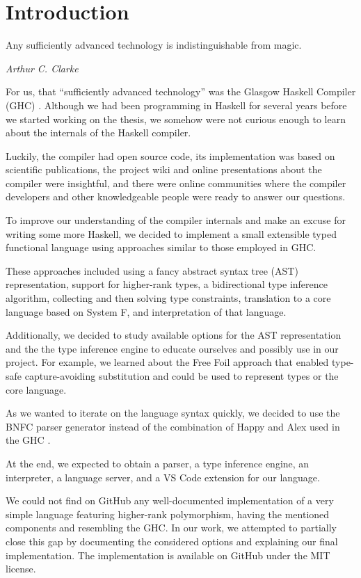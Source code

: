 \chapter{Introduction}
\label{chap:Introduction}

\epigraph{Any sufficiently advanced technology is indistinguishable from magic.}{\textit{Arthur C. Clarke}}

For us, that ``sufficiently advanced technology'' was the Glasgow Haskell Compiler (GHC) \cite{ghc-site}.
Although we had been programming in Haskell for several years before we started working on the thesis, we somehow were not curious enough to learn about the internals of the Haskell compiler.

Luckily, the compiler had open source code, its implementation was based on scientific publications, the project wiki and online presentations about the compiler were insightful, and there were online communities where the compiler developers and other knowledgeable people were ready to answer our questions.

To improve our understanding of the compiler internals and make an excuse for  writing some more Haskell, we decided to implement a small extensible typed functional language using approaches similar to those employed in GHC.

These approaches included using a fancy abstract syntax tree (AST) representation, support for higher-rank types, a bidirectional type inference algorithm, collecting and then solving type constraints, translation to a core language based on System F, and interpretation of that language.

Additionally, we decided to study available options for the AST representation and the the type inference engine to educate ourselves and possibly use in our project. For example, we learned about the Free Foil approach \cite{kudasov-free-2024} that enabled type-safe capture-avoiding substitution and could be used to represent types or the core language.

As we wanted to iterate on the language syntax quickly, we decided to use the BNFC parser generator \cite{bnfc-parser-generator} instead of the combination of Happy and Alex used in the GHC \cite{ghc-2025}.

At the end, we expected to obtain a parser, a type inference engine, an interpreter, a language server, and a VS Code extension for our language.

We could not find on GitHub any well-documented implementation of a very simple language featuring higher-rank polymorphism, having the mentioned components and resembling the GHC. In our work, we attempted to partially close this gap by documenting the considered options and explaining our final implementation. The implementation \cite{deemp-higher-rank-free-foil} is available on GitHub under the MIT license.

